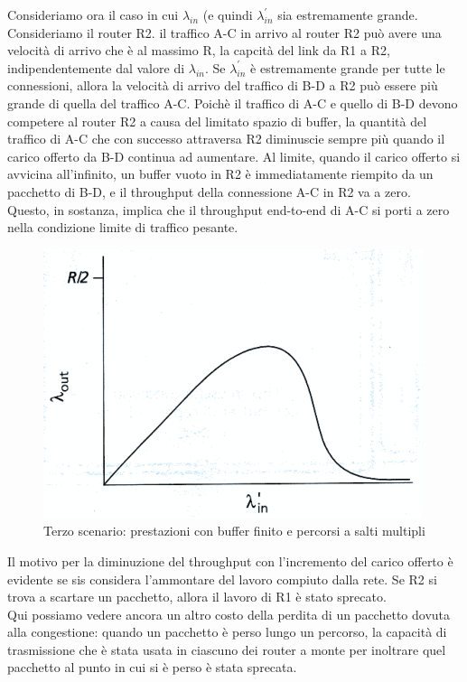 \documentclass[11pt,a4paper]{article}
\begin{document}
Consideriamo ora il caso in cui $\lambda_{in}$ (e quindi $\lambda_{in}^{'}$ sia estremamente grande. Consideriamo il router R2. il traffico A-C in arrivo al router R2 può avere una velocità di arrivo che è al massimo R, la capcità del link da R1 a R2, indipendentemente dal valore di $\lambda_{in}$. Se $\lambda_{in}^{'}$ è estremamente grande per tutte le connessioni, allora la velocità di arrivo del traffico di B-D a R2 può essere più grande di quella del traffico A-C. Poichè il traffico di A-C e quello di B-D devono competere al router R2 a causa del limitato spazio di buffer, la quantità del traffico di A-C che con successo attraversa R2 diminuscie sempre più quando il carico offerto da B-D continua ad aumentare. Al limite, quando il carico offerto si avvicina all'infinito, un buffer vuoto in R2 è immediatamente riempito da un pacchetto di B-D, e il throughput della connessione A-C in R2 va a zero. \\
Questo, in sostanza, implica che il throughput end-to-end di A-C si porti a zero nella condizione limite di traffico pesante. \\
\begin{figure}
	\includegraphics[scale=0.6]{img/044.png}
	\caption{Terzo scenario: prestazioni con buffer finito e percorsi a salti multipli}
\end{figure}
Il motivo per la diminuzione del throughput con l'incremento del carico offerto è evidente se sis considera l'ammontare del lavoro compiuto dalla rete. Se R2 si trova a scartare un pacchetto, allora il lavoro di R1 è stato sprecato. \\
Qui possiamo vedere ancora un altro costo della perdita di un pacchetto dovuta alla congestione: quando un pacchetto è perso lungo un percorso, la capacità di trasmissione che è stata usata in ciascuno dei router a monte per inoltrare quel pacchetto al punto in cui si è perso è stata sprecata.
\end{document}

